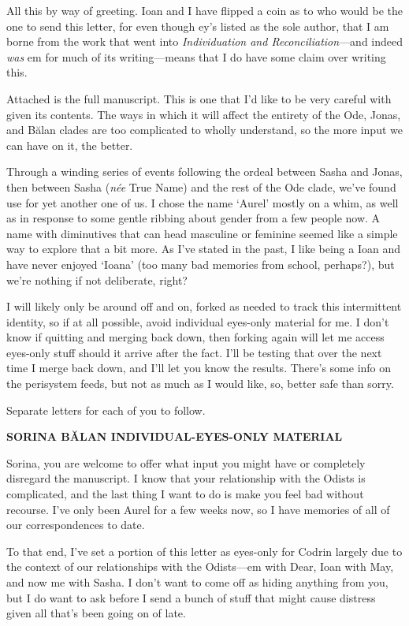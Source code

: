 All this by way of greeting. Ioan and I have flipped a coin as to who would be the one to send this letter, for even though ey's listed as the sole author, that I am borne from the work that went into \emph{Individuation and Reconciliation}—and indeed \emph{was} em for much of its writing—means that I do have some claim over writing this.

Attached is the full manuscript. This is one that I'd like to be very careful with given its contents. The ways in which it will affect the entirety of the Ode, Jonas, and Bălan clades are too complicated to wholly understand, so the more input we can have on it, the better.

Through a winding series of events following the ordeal between Sasha and Jonas, then between Sasha (\emph{née} True Name) and the rest of the Ode clade, we've found use for yet another one of us. I chose the name `Aurel' mostly on a whim, as well as in response to some gentle ribbing about gender from a few people now. A name with diminutives that can head masculine or feminine seemed like a simple way to explore that a bit more. As I've stated in the past, I like being a Ioan and have never enjoyed `Ioana' (too many bad memories from school, perhaps?), but we're nothing if not deliberate, right?

I will likely only be around off and on, forked as needed to track this intermittent identity, so if at all possible, avoid individual eyes-only material for me. I don't know if quitting and merging back down, then forking again will let me access eyes-only stuff should it arrive after the fact. I'll be testing that over the next time I merge back down, and I'll let you know the results. There's some info on the perisystem feeds, but not as much as I would like, so, better safe than sorry.

Separate letters for each of you to follow.

\begin{center}
\textbf{SORINA BĂLAN INDIVIDUAL-EYES-ONLY MATERIAL}
\end{center}

Sorina, you are welcome to offer what input you might have or completely disregard the manuscript. I know that your relationship with the Odists is complicated, and the last thing I want to do is make you feel bad without recourse. I've only been Aurel for a few weeks now, so I have memories of all of our correspondences to date.

To that end, I've set a portion of this letter as eyes-only for Codrin largely due to the context of our relationships with the Odists—em with Dear, Ioan with May, and now me with Sasha. I don't want to come off as hiding anything from you, but I do want to ask before I send a bunch of stuff that might cause distress given all that's been going on of late.

